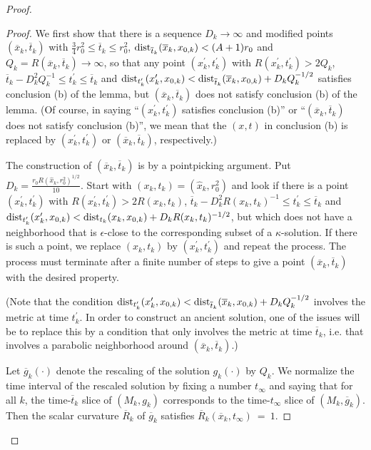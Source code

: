 \begin{proof}
\begin{proof}
We first show that there is a sequence $D_k \rightarrow \infty$
and modified points $(\overline{x}_k, \overline{t}_k)$
with $\frac{3}{4} r_0^{2} \le \overline{t}_k \le r_0^{2}$,
$\operatorname{dist}_{\overline{t}_k}(\overline{x}_k, x_{0,k}) < (A+1) r_0$ and
$Q_k = R(\overline{x}_k, \overline{t}_k) \rightarrow \infty$,
so that any point
$(x^\prime_k, t^\prime_k)$ with $R(x^\prime_k, t^\prime_k) > 2Q_k$,
$\overline{t}_k - D_k^2 Q_k^{-1} \le
t^\prime_k \le \overline{t}_k$ and
$\operatorname{dist}_{t^\prime_k}(x^\prime_k, {x}_{0,k})
< \operatorname{dist}_{\overline{t}_k}(\overline{x}_k,
x_{0,k}) +
D_k Q_k^{-1/2}$ satisfies conclusion (b) of the lemma,
but $(\overline{x}_k, \overline{t}_k)$ does not satisfy conclusion (b) of
the lemma. (Of course, in saying ``$(x^\prime_k, t^\prime_k)$
satisfies conclusion (b)'' or
``$(\overline{x}_k, \overline{t}_k)$ does not satisfy conclusion (b)'', we mean that
the $(x,t)$ in conclusion (b) is replaced by $(x^\prime_k, t^\prime_k)$ or
$(\overline{x}_k, \overline{t}_k)$, respectively.)

The construction of $(\overline{x}_k, \overline{t}_k)$ is by a pointpicking
argument.
Put $D_k = \frac{r_0 R(\hat{x}_k, r_0^2)^{1/2}}{10}$.
Start with $(x_k, t_k) = (\hat{x}_k, r_0^2)$
and look if there is a point
$(x^\prime_k, t^\prime_k)$ with $R(x^\prime_k, t^\prime_k) > 2
R(x_k, t_k)$,
$\overline{t}_k - D_k^2 R(x_k, t_k)^{-1} \le
t^\prime_k \le \overline{t}_k$ and
$\operatorname{dist}_{t^\prime_k}(x^\prime_k, {x}_{0,k})
< \operatorname{dist}_{{t}_k}({x}_k,
x_{0,k}) +
D_k R(x_k, t_k)^{-1/2}$, but
which does not have a neighborhood that is
$\epsilon$-close to the corresponding subset of a $\kappa$-solution.
If there is such a point, we replace $(x_k, t_k)$ by $(x^\prime_k,
t^\prime_k)$ and repeat the process.  The process must terminate after
a finite number of steps to give a point
$(\overline{x}_k, \overline{t}_k)$ with the desired property.

(Note that the condition
$\operatorname{dist}_{t^\prime_k}(x^\prime_k, {x}_{0,k})
< \operatorname{dist}_{\overline{t}_k}(\overline{x}_k,
x_{0,k}) +
D_k Q_k^{-1/2}$ involves the metric at time $t^\prime_k$. In order
to construct an ancient solution, one of the issues will be to
replace this by a condition that only involves the metric at time
$\overline{t}_k$, i.e. that involves a parabolic neighborhood
around $(\overline{x}_k, \overline{t}_k)$.)

Let $\overline{g}_k(\cdot)$ denote
the rescaling of the solution $g_k(\cdot)$ by $Q_k$. We
normalize the time interval of the rescaled solution
by fixing a number ${t}_\infty$
and saying that for all $k$,
the time-$\overline{t}_k$ slice of $(M_k, g_k)$ corresponds to the
time-${t}_\infty$ slice of $(M_k, \overline{g}_k)$.
Then the scalar
curvature $\overline{R}_k$ of $\overline{g}_k$ satisfies
$\overline{R}_k(\overline{x}_k, {t}_\infty) \: = \: 1$.


\end{proof}
\end{proof}

